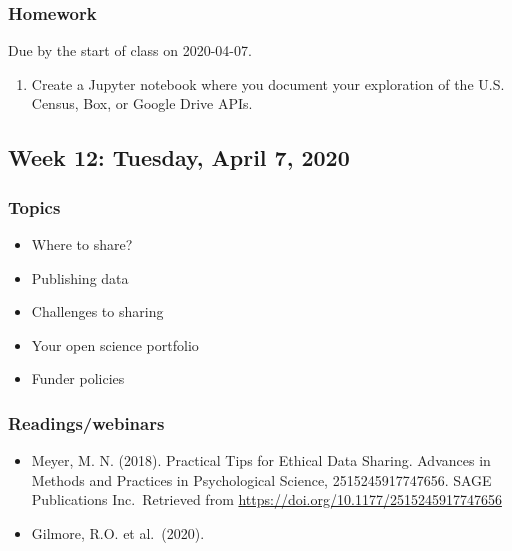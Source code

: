 \documentclass[
]{article}
\providecommand{\tightlist}{%
  \setlength{\itemsep}{0pt}\setlength{\parskip}{0pt}}
\begin{document}
\hypertarget{homework-10}{%
\subsubsection{Homework}\label{homework-10}}

Due by the start of class on 2020-04-07.

\begin{enumerate}
\def\labelenumi{\arabic{enumi}.}
\tightlist
\item
  Create a Jupyter notebook where you document your exploration of the
  U.S. Census, Box, or Google Drive APIs.
\end{enumerate}

\hypertarget{week-12-tuesday-april-7-2020}{%
\subsection{Week 12: Tuesday, April 7,
2020}\label{week-12-tuesday-april-7-2020}}

\hypertarget{topics-11}{%
\subsubsection{Topics}\label{topics-11}}

\begin{itemize}
\tightlist
\item
  Where to share?
\item
  Publishing data
\item
  Challenges to sharing
\item
  Your open science portfolio
\item
  Funder policies
\end{itemize}

\hypertarget{readingswebinars-8}{%
\subsubsection{Readings/webinars}\label{readingswebinars-8}}

\begin{itemize}
\tightlist
\item
  Meyer, M. N. (2018). Practical Tips for Ethical Data Sharing. Advances
  in Methods and Practices in Psychological Science, 2515245917747656.
  SAGE Publications Inc.~Retrieved from
  \url{https://doi.org/10.1177/2515245917747656}
\item
  Gilmore, R.O. et al.~(2020).
\end{itemize}
\end{document}
